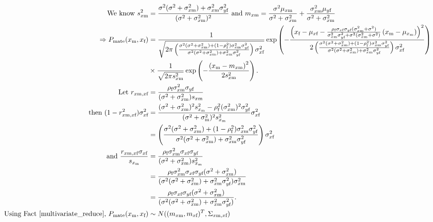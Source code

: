 \documentclass{article}
\newcommand{\x}[1]{\text{#1}}
\begin{document}
\begin{pf}
\begin{enumerate}
\begin{align*}
\text{ We know } s_{x\x{m}}^2&=\frac{\sigma^2(\sigma^2+\sigma_{x\x{m}}^2)+\sigma_{x\x{m}}^2\sigma_{y\x{f}}^2}{(\sigma^2+\sigma_{x\x{m}}^2)^2} \text{ and } m_{x\x{m}}=\frac{\sigma^2\mu_{x\x{m}}}{\sigma^2+\sigma_{x\x{m}}^2}+\frac{\sigma_{x\x{m}}^2\mu_{y\x{f}}}{\sigma^2+\sigma_{x\x{m}}^2}
\\\Rightarrow P_\text{mate}(x_\x{m},x_\x{f})&=\frac{1}{\sqrt{2\pi \left(\frac{\sigma^2(\sigma^2+\sigma_{x\x{m}}^2)+(1-\rho_\x{f}^2)\sigma_{x\x{m}}^2\sigma_{y\x{f}}^2}{\sigma^2(\sigma^2+\sigma_{x\x{m}}^2)+\sigma_{x\x{m}}^2\sigma_{y\x{f}}^2}\right)\sigma_{x\x{f}}^2}}\exp\left(-\frac{\left(x_\x{f}-\mu_{x\x{f}}-\frac{\rho_\x{f}\sigma_{x\x{f}}\sigma_{y\x{f}}(\sigma_{x\x{m}}^2+\sigma^2)}{\sigma_{x\x{m}}^2\sigma_{y\x{f}}^2+\sigma^2(\sigma_{x\x{m}}^2+\sigma^2)}\left(x_\x{m}-\mu_{x_\x{m}}\right)\right)^2}{2\left(\frac{\sigma^2(\sigma^2+\sigma_{x\x{m}}^2)+(1-\rho_\x{f}^2)\sigma_{x\x{m}}^2\sigma_{y\x{f}}^2}{\sigma^2(\sigma^2+\sigma_{x\x{m}}^2)+\sigma_{x\x{m}}^2\sigma_{y\x{f}}^2}\right)\sigma_{x\x{f}}^2}\right)
\\&\times\frac{1}{\sqrt{2\pi s_{x\x{m}}^2}}\exp\left(-\frac{\left(x_\x{m}-m_{x\x{m}}\right)^2}{2s_{x\x{m}}^2}\right).
\\ \text{ Let } r_{x\x{m},x\x{f}}&=\frac{\rho_\x{f}\sigma_{x\x{m}}^2\sigma_{y\x{f}}}{(\sigma^2+\sigma_{x\x{m}}^2)s_{x\x{m}}}
\\ \text{ then } (1-r_{x\x{m},x\x{f}}^2)\sigma_{x\x{f}}^2&=\frac{(\sigma^2+\sigma_{x\x{m}}^2)^2s_{x_\x{m}}^2-\rho_\x{f}^2(\sigma_{x\x{m}}^2)^2\sigma_{y\x{f}}^2}{(\sigma^2+\sigma_{\x{m}}^2)^2s_{x_\x{m}}^2}\sigma_{x\x{f}}^2
\\&=\left(\frac{\sigma^2(\sigma^2+\sigma_{x\x{m}}^2)+(1-\rho_\x{f}^2)\sigma_{x\x{m}}^2\sigma_{y\x{f}}^2}{\sigma^2(\sigma^2+\sigma_{x\x{m}}^2)+\sigma_{x\x{m}}^2\sigma_{y\x{f}}^2}\right)\sigma_{x\x{f}}^2
\\ \text{ and } \frac{r_{x\x{m},x\x{f}}\sigma_{x\x{f}}}{s_{x_\x{m}}}&=\frac{\rho_\x{f}\sigma_{x\x{m}}^2\sigma_{x\x{f}}\sigma_{y\x{f}}}{(\sigma^2+\sigma_{x\x{m}}^2)s_{x_\x{m}}^2}
\\&=\frac{\rho_\x{f}\sigma_{x\x{m}}^2\sigma_{x\x{f}}\sigma_{y\x{f}}(\sigma^2+\sigma_{x\x{m}}^2)}{(\sigma^2(\sigma^2+\sigma_{x\x{m}}^2)+\sigma_{x\x{m}}^2\sigma_{y\x{f}}^2)\sigma_{x\x{m}}^2}
\\&=\frac{\rho_\x{f}\sigma_{x\x{f}}\sigma_{y\x{f}}(\sigma^2+\sigma_{x\x{m}}^2)}{(\sigma^2(\sigma^2+\sigma_{x\x{m}}^2)+\sigma_{x\x{m}}^2\sigma_{y\x{f}}^2)}.
\\ \text{Using Fact \ref{multivariate_reduce}, }  P_\text{mate}(x_\x{m},x_\x{f})&\sim N((m_{x\x{m}},m_{x\x{f}})^T,\Sigma_{x\x{m},x\x{f}})

\end{align*}
\end{enumerate}
\end{pf}
\end{document}

